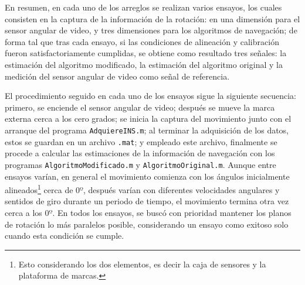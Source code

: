 \documentclass[conference]{IEEEtran}
\begin{document}
En resumen, en cada uno de los arreglos se realizan varios ensayos, los cuales consisten en la captura de la información de la rotación: en una dimensión para el sensor angular de video, y tres dimensiones para los algoritmos de navegación; de forma tal que tras cada ensayo, si las condiciones de alineación y calibración fueron satisfactoriamente cumplidas, se obtiene como resultado tres señales: la estimación del algoritmo modificado, la estimación del algoritmo original y la medición del sensor angular de video como señal de referencia.\par
El procedimiento seguido en cada uno de los ensayos sigue la siguiente secuencia: primero, se enciende el sensor angular de video; después se mueve la marca externa cerca a los cero grados; se inicia la captura del movimiento junto con el arranque del programa \texttt{AdquiereINS.m}; al terminar la adquisición de los datos, estos se guardan en un archivo \texttt{.mat}; y empleado este archivo, finalmente se procede a calcular las estimaciones de la información de navegación con los programas \texttt{AlgoritmoModificado.m} y \texttt{AlgoritmoOriginal.m}. Aunque entre ensayos varían, en general el movimiento comienza con los ángulos inicialmente alineados\footnote{Esto considerando los dos elementos, es decir la caja de sensores y la plataforma de marcas.} cerca de $0º$, después varían con diferentes velocidades angulares y sentidos de giro durante un periodo de tiempo, el movimiento termina otra vez cerca a los $0º$. En todos los ensayos, se buscó con prioridad mantener los planos de rotación lo más paralelos posible, considerando un ensayo como exitoso solo cuando esta condición se cumple.
\end{document}
